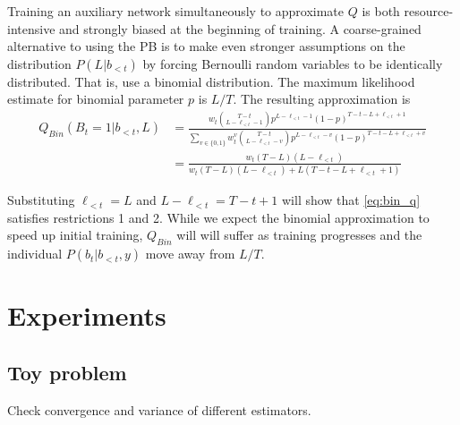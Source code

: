 \documentclass{article}
\begin{document}
Training an auxiliary network simultaneously to approximate $Q$ is both
resource-intensive and strongly biased at the beginning of training. A
coarse-grained alternative to using the PB is to make even stronger assumptions
on the distribution $P(L|b_{<t})$ by forcing Bernoulli random variables to be
identically distributed. That is, use a binomial distribution. The maximum
likelihood estimate for binomial parameter $p$ is $L / T$. The resulting
approximation is
%
\begin{equation} \label{eq:bin_q}
\begin{split}
Q_{Bin}(B_t=1|b_{<t}, L)
    &= \frac{
            w_t \binom{T - t}{L - \ell_{<t} - 1} p^{L - \ell_{<t} - 1}
            (1 - p)^{T - t - L + \ell_{<t} + 1}}
        {\sum_{v \in \{0,1\}}
            w_t^v \binom{T - t}{L - \ell_{<t} - v}p^{L - \ell_{<t} - v}
            (1 - p)^{T - t - L + \ell_{<t} + v}} \\
    &= \frac{w_t (T - L)(L - \ell_{<t})}
            {w_t (T - L)(L - \ell_{<t}) + L(T - t - L + \ell_{<t} + 1)}
\end{split}
\end{equation}

Substituting $\ell_{<t} = L$ and $L - \ell_{<t} = T - t + 1$ will show that
\cref{eq:bin_q} satisfies restrictions 1 and 2. While we expect the binomial
approximation to speed up initial training, $Q_{Bin}$ will will suffer as
training progresses and the individual $P(b_t|b_{<t}, y)$ move away from $L /
T$.


\section{Experiments} \label{sec:experiments}

\subsection{Toy problem}

Check convergence and variance of different estimators.
\end{document}
